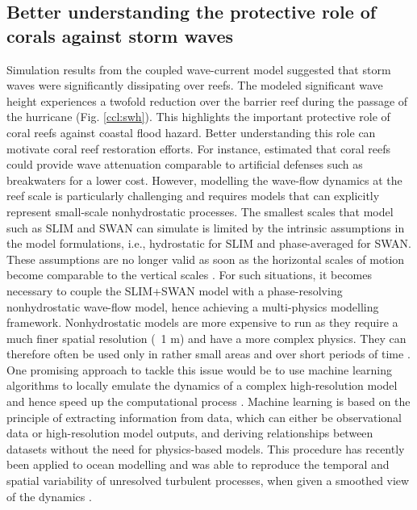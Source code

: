 \subsection*{Better understanding the protective role of corals against storm waves}
Simulation results from the coupled wave-current model suggested that storm waves were significantly dissipating over reefs. The modeled significant wave height experiences a twofold reduction over the barrier reef during the passage of the hurricane (Fig. \ref{ccl:swh}). This highlights the important protective role of coral reefs against coastal flood hazard. Better understanding this role can motivate coral reef restoration efforts. For instance, \citep{ferrario2014effectiveness} estimated that coral reefs could provide wave attenuation comparable to artificial defenses such as breakwaters for a lower cost. However, modelling the wave-flow dynamics at the reef scale is particularly challenging and requires models that can explicitly represent small-scale nonhydrostatic processes. The smallest scales that model such as SLIM and SWAN can simulate is limited by the intrinsic assumptions in the model formulations, i.e., hydrostatic for SLIM and phase-averaged for SWAN. These assumptions are no longer valid as soon as the horizontal scales of motion become comparable to the vertical scales \citep{marshall1997hydrostatic}. For such situations, it becomes necessary to couple the SLIM+SWAN model with a phase-resolving nonhydrostatic wave-flow model, hence achieving a multi-physics modelling framework. Nonhydrostatic models are more expensive to run as they require a much finer spatial resolution (~1 m) and have a more complex physics. They can therefore often be used only in rather small areas and over short periods of time \citep{fringer2019future}. One promising approach to tackle this issue would be to use machine learning algorithms to locally emulate the dynamics of a complex high-resolution model and hence speed up the computational process \citep{kasim2021building}. Machine learning is based on the principle of extracting information from data, which can either be observational data or high-resolution model outputs, and deriving relationships between datasets without the need for physics-based models. This procedure has recently been applied to ocean modelling and was able to reproduce the temporal and spatial variability of unresolved turbulent processes, when given a smoothed view of the dynamics \citep{bolton2019applications}. 

